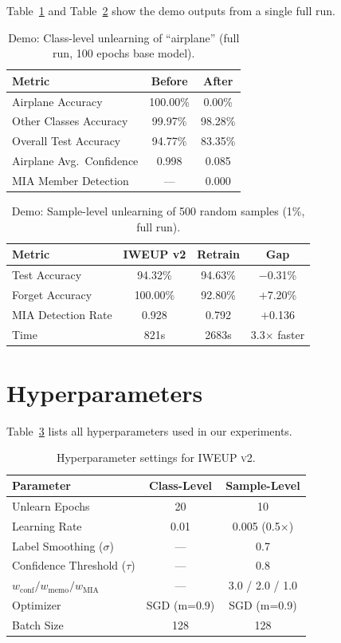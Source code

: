 \documentclass[11pt]{article}
\newcommand{\method}{\textsc{IWEUP v2}}
\begin{document}
Table~\ref{tab:demo_class} and Table~\ref{tab:demo_sample} show the demo outputs from a single full run.

\begin{table}[h]
\centering
\caption{Demo: Class-level unlearning of ``airplane'' (full run, 100 epochs base model).}
\label{tab:demo_class}
\begin{tabular}{lcc}
\toprule
\textbf{Metric} & \textbf{Before} & \textbf{After} \\
\midrule
Airplane Accuracy & 100.00\% & 0.00\% \\
Other Classes Accuracy & 99.97\% & 98.28\% \\
Overall Test Accuracy & 94.77\% & 83.35\% \\
Airplane Avg.\ Confidence & 0.998 & 0.085 \\
MIA Member Detection & --- & 0.000 \\
\bottomrule
\end{tabular}
\end{table}

\begin{table}[h]
\centering
\caption{Demo: Sample-level unlearning of 500 random samples (1\%, full run).}
\label{tab:demo_sample}
\begin{tabular}{lccc}
\toprule
\textbf{Metric} & \textbf{IWEUP v2} & \textbf{Retrain} & \textbf{Gap} \\
\midrule
Test Accuracy & 94.32\% & 94.63\% & $-$0.31\% \\
Forget Accuracy & 100.00\% & 92.80\% & $+$7.20\% \\
MIA Detection Rate & 0.928 & 0.792 & $+$0.136 \\
Time & 821s & 2683s & 3.3$\times$ faster \\
\bottomrule
\end{tabular}
\end{table}

\section{Hyperparameters}
\label{app:hyperparams}

Table~\ref{tab:hyperparams} lists all hyperparameters used in our experiments.

\begin{table}[h]
\centering
\caption{Hyperparameter settings for \method{}.}
\label{tab:hyperparams}
\begin{tabular}{lcc}
\toprule
\textbf{Parameter} & \textbf{Class-Level} & \textbf{Sample-Level} \\
\midrule
Unlearn Epochs & 20 & 10 \\
Learning Rate & 0.01 & 0.005 (0.5$\times$) \\
Label Smoothing ($\sigma$) & --- & 0.7 \\
Confidence Threshold ($\tau$) & --- & 0.8 \\
$w_{\text{conf}} / w_{\text{memo}} / w_{\text{MIA}}$ & --- & 3.0 / 2.0 / 1.0 \\
Optimizer & SGD (m=0.9) & SGD (m=0.9) \\
Batch Size & 128 & 128 \\
\bottomrule
\end{tabular}
\end{table}
\end{document}
